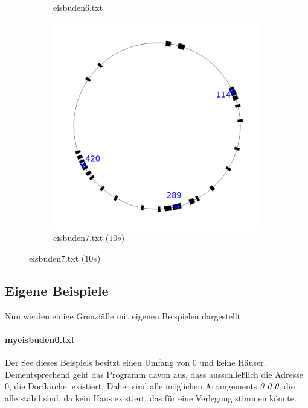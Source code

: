 \documentclass[a4paper,10pt,ngerman,captions=figureheading]{scrartcl}
\newcommand{\imageWidth}{0.3\linewidth}
\begin{document}
\begin{figure}[ht]
\begin{subfigure}[t]{\imageWidth}
        \caption{eisbuden6.txt}
        \label{fig:eisbuden6}
    \end{subfigure}
    \begin{subfigure}[t]{\imageWidth}
        \includegraphics[width=\linewidth]{eisbuden7.png}
        \caption{eisbuden7.txt ($10s$)}
        \label{fig:eisbuden7}
    \end{subfigure}
\end{figure}

\subsection{Eigene Beispiele}
Nun werden einige Grenzfälle mit eigenen Beispielen dargestellt.

\paragraph{myeisbuden0.txt}
Der See dieses Beispiels besitzt einen Umfang von $0$ und keine Häuser.
Dementsprechend geht das Programm davon aus, dass ausschließlich die Adresse 0, die Dorfkirche, existiert.
Daher sind alle möglichen Arrangements \emph{0 0 0}, die alle stabil sind, da kein Haus existiert, das für eine Verlegung stimmen könnte.
\end{document}
